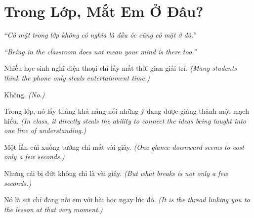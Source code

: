 \chapter{Trong Lớp, Mắt Em Ở Đâu?}

\begin{center}
	\textit{\color{bookprimary}``Có mặt trong lớp không có nghĩa là đầu óc cũng có mặt ở đó.''}

	\textit{\color{bookprimary}``Being in the classroom does not mean your mind is there too.''}
\end{center}

\ngancach

\begin{tcolorbox}[colback=booksecondary!8,colframe=booksecondary!40,arc=5pt,title={\bfseries Góc Suy Nghĩ},fonttitle=\bfseries\color{booksecondary}]
Nhiều học sinh nghĩ điện thoại chỉ lấy mất thời gian giải trí.
\textit{(Many students think the phone only steals entertainment time.)}

Không.
\textit{(No.)}

Trong lớp, nó lấy thẳng khả năng nối những ý đang được giảng thành một mạch hiểu.
\textit{(In class, it directly steals the ability to connect the ideas being taught into one line of understanding.)}

Một lần cúi xuống tưởng chỉ mất vài giây.
\textit{(One glance downward seems to cost only a few seconds.)}

Nhưng cái bị đứt không chỉ là vài giây.
\textit{(But what breaks is not only a few seconds.)}

Nó là sợi chỉ đang nối em với bài học ngay lúc đó.
\textit{(It is the thread linking you to the lesson at that very moment.)}
\end{tcolorbox}

